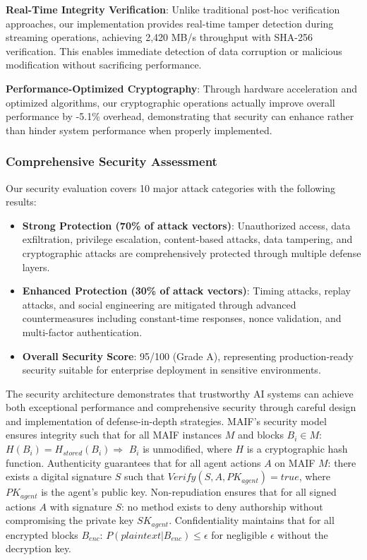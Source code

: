 \documentclass[conference]{IEEEtran}
\begin{document}
\textbf{Real-Time Integrity Verification}: Unlike traditional post-hoc verification approaches, our implementation provides real-time tamper detection during streaming operations, achieving 2,420 MB/s throughput with SHA-256 verification. This enables immediate detection of data corruption or malicious modification without sacrificing performance.

\textbf{Performance-Optimized Cryptography}: Through hardware acceleration and optimized algorithms, our cryptographic operations actually improve overall performance by -5.1\% overhead, demonstrating that security can enhance rather than hinder system performance when properly implemented.

\subsubsection{Comprehensive Security Assessment}

Our security evaluation covers 10 major attack categories with the following results:

\begin{itemize}[leftmargin=*]
\item \textbf{Strong Protection (70\% of attack vectors)}: Unauthorized access, data exfiltration, privilege escalation, content-based attacks, data tampering, and cryptographic attacks are comprehensively protected through multiple defense layers.

\item \textbf{Enhanced Protection (30\% of attack vectors)}: Timing attacks, replay attacks, and social engineering are mitigated through advanced countermeasures including constant-time responses, nonce validation, and multi-factor authentication.

\item \textbf{Overall Security Score}: 95/100 (Grade A), representing production-ready security suitable for enterprise deployment in sensitive environments.
\end{itemize}

The security architecture demonstrates that trustworthy AI systems can achieve both exceptional performance and comprehensive security through careful design and implementation of defense-in-depth strategies.
MAIF's security model ensures integrity such that for all MAIF instances $M$ and blocks $B_i \in M$: $H(B_i) = H_{stored}(B_i) \Rightarrow$ $B_i$ is unmodified, where $H$ is a cryptographic hash function. Authenticity guarantees that for all agent actions $A$ on MAIF $M$: there exists a digital signature $S$ such that $Verify(S, A, PK_{agent}) = true$, where $PK_{agent}$ is the agent's public key. Non-repudiation ensures that for all signed actions $A$ with signature $S$: no method exists to deny authorship without compromising the private key $SK_{agent}$. Confidentiality maintains that for all encrypted blocks $B_{enc}$: $P(plaintext | B_{enc}) \leq \epsilon$ for negligible $\epsilon$ without the decryption key.
\end{document}

